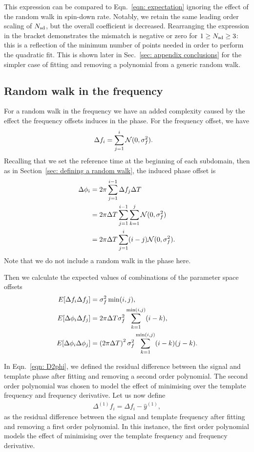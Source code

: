 \documentclass[../full_thesis/full_thesis.tex]{subfiles}
\begin{document}
This expression can be compared to Eqn.~\eqref{eqn: expectation} ignoring the
effect of the random walk in spin-down rate. Notably, we retain the same
leading order scaling of $N_{\textrm{sd}}$, but the overall coefficient is decreased.
Rearranging the expression in the bracket demonstrates the mismatch is negative
or zero for $1 \ge N_{\textrm{sd}} \ge 3$: this is a reflection of the minimum number of
points needed in order to perform the quadratic fit. This is shown later in
Sec.~\ref{sec: appendix conclusions} for the simpler case of fitting and
removing a polynomial from a generic random walk.

\subsection{Random walk in the frequency}

For a random walk in the frequency we have an added complexity caused by the
effect the frequency offsets induces in the phase. For the frequency offset, we
have
\begin{align}
\Delta f_{i} &= \sum_{j=1}^{i}\mathcal{N}(0, \sigma_{f}^{2}).
\end{align}
Recalling that we set the reference time at the beginning of each subdomain,
then as in Section~\ref{sec: defining a random walk}, the induced phase offset is
\begin{align}
\Delta\phi_{i} &=2\pi \sum_{j=1}^{i-1}\Delta f_{j}\Delta T \\
 & = 2\pi\Delta T \sum_{j=1}^{i-1}\sum_{k=1}^{j}\mathcal{N}(0, \sigma_{f}^{2}) \\
& = 2\pi\Delta T \sum_{j=1}^{i}(i-j)\mathcal{N}(0, \sigma_{f}^{2}).
\label{eqn: P2F}
\end{align}
Note that we do not include a random walk in the phase here.

Then we calculate the expected values of combinations of the parameter space
offsets
\begin{align}
E[\Delta f_{i}\Delta f_{j}] & = \sigma_{f}^{2} \min(i, j), \label{eqn: E1} \\
E[\Delta\phi_{i}\Delta f_{j}] & = 2 \pi \Delta T \sigma_{f}^{2} \sum_{k=1}^{\min(i, j)}(i-k), \label{eqn: E2}\\
E[\Delta\phi_{i}\Delta\phi_{j}] & =
\left(2\pi\Delta T\right)^{2}\sigma_{f}^{2} \sum_{k=1}^{\min(i, j)}(i-k)(j-k).
\label{eqn: E3}
\end{align}

In Eqn.~\eqref{eqn: D2phi}, we defined the residual difference between the signal
and template phase after fitting and removing a second order polynomial. The
second order polynomial was chosen to model the effect of minimising over the
template frequency and frequency derivative. Let us now define
\begin{align}
\Delta^{(1)}f_i = \Delta f_i - \hat{y}^{(1)},
\label{eqn: D2f}
\end{align}
as the residual difference between the signal and template frequency after
fitting and removing a first order polynomial. In this instance, the first
order polynomial models the effect of minimising over the template
frequency and frequency derivative.
\end{document}

